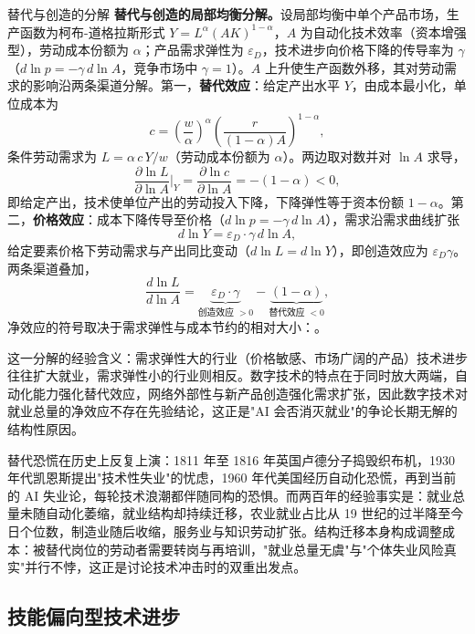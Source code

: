 \begin{derivation}{替代与创造的分解}{}
\textbf{替代与创造的局部均衡分解。}设局部均衡中单个产品市场，生产函数为柯布-道格拉斯形式 $Y = L^\alpha (AK)^{1-\alpha}$，$A$ 为自动化技术效率（资本增强型），劳动成本份额为 $\alpha$；产品需求弹性为 $\varepsilon_D$，技术进步向价格下降的传导率为 $\gamma$（$d\ln p = -\gamma\, d\ln A$，竞争市场中 $\gamma = 1$）。$A$ 上升使生产函数外移，其对劳动需求的影响沿两条渠道分解。第一，\textbf{替代效应}：给定产出水平 $Y$，由成本最小化，单位成本为
\[
c = \left(\frac{w}{\alpha}\right)^{\alpha}\left(\frac{r}{(1-\alpha)A}\right)^{1-\alpha},
\]
条件劳动需求为 $L = \alpha\, c\, Y / w$（劳动成本份额为 $\alpha$）。两边取对数并对 $\ln A$ 求导，
\[
\frac{\partial \ln L}{\partial \ln A}\Big|_{Y} = \frac{\partial \ln c}{\partial \ln A} = -(1-\alpha) < 0,
\]
即给定产出，技术使单位产出的劳动投入下降，下降弹性等于资本份额 $1-\alpha$。第二，\textbf{价格效应}：成本下降传导至价格（$d\ln p = -\gamma\, d\ln A$），需求沿需求曲线扩张
\[
d\ln Y = \varepsilon_D \cdot \gamma\, d\ln A,
\]
给定要素价格下劳动需求与产出同比变动（$d\ln L = d\ln Y$），即创造效应为 $\varepsilon_D \gamma$。两条渠道叠加，
\[
\frac{d\ln L}{d\ln A} = \underbrace{\varepsilon_D \cdot \gamma}_{\text{创造效应 } > 0} - \underbrace{(1 - \alpha)}_{\text{替代效应 } < 0},
\]
净效应的符号取决于需求弹性与成本节约的相对大小：。
\end{derivation}

这一分解的经验含义：需求弹性大的行业（价格敏感、市场广阔的产品）技术进步往往扩大就业，需求弹性小的行业则相反。数字技术的特点在于同时放大两端，自动化能力强化替代效应，网络外部性与新产品创造强化需求扩张，因此数字技术对就业总量的净效应不存在先验结论，这正是"AI 会否消灭就业"的争论长期无解的结构性原因。

替代恐慌在历史上反复上演：1811 年至 1816 年英国卢德分子捣毁织布机，1930 年代凯恩斯提出"技术性失业"的忧虑，1960 年代美国经历自动化恐慌，再到当前的 AI 失业论，每轮技术浪潮都伴随同构的恐惧。而两百年的经验事实是：就业总量未随自动化萎缩，就业结构却持续迁移，农业就业占比从 19 世纪的过半降至今日个位数，制造业随后收缩，服务业与知识劳动扩张。结构迁移本身构成调整成本：被替代岗位的劳动者需要转岗与再培训，"就业总量无虞"与"个体失业风险真实"并行不悖，这正是讨论技术冲击时的双重出发点。

\subsection{技能偏向型技术进步}

